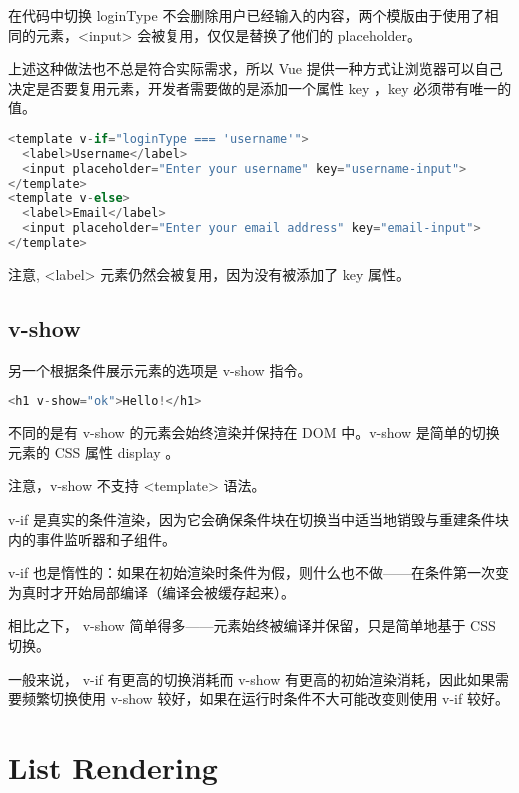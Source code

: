 在代码中切换 loginType 不会删除用户已经输入的内容，两个模版由于使用了相同的元素，<input> 会被复用，仅仅是替换了他们的 placeholder。

上述这种做法也不总是符合实际需求，所以 Vue 提供一种方式让浏览器可以自己决定是否要复用元素，开发者需要做的是添加一个属性 key ，key 必须带有唯一的值。

\begin{lstlisting}[language=JavaScript]
<template v-if="loginType === 'username'">
  <label>Username</label>
  <input placeholder="Enter your username" key="username-input">
</template>
<template v-else>
  <label>Email</label>
  <input placeholder="Enter your email address" key="email-input">
</template>
\end{lstlisting}

注意, <label> 元素仍然会被复用，因为没有被添加了 key 属性。


\subsection{v-show}

另一个根据条件展示元素的选项是 v-show 指令。


\begin{lstlisting}[language=JavaScript]
<h1 v-show="ok">Hello!</h1>
\end{lstlisting}

不同的是有 v-show 的元素会始终渲染并保持在 DOM 中。v-show 是简单的切换元素的 CSS 属性 display 。


注意，v-show 不支持 <template> 语法。

\begin{compactitem}
\item v-if 是真实的条件渲染，因为它会确保条件块在切换当中适当地销毁与重建条件块内的事件监听器和子组件。
\item v-if 也是惰性的：如果在初始渲染时条件为假，则什么也不做——在条件第一次变为真时才开始局部编译（编译会被缓存起来）。
\end{compactitem}


相比之下， v-show 简单得多——元素始终被编译并保留，只是简单地基于 CSS 切换。

一般来说， v-if 有更高的切换消耗而 v-show 有更高的初始渲染消耗，因此如果需要频繁切换使用 v-show 较好，如果在运行时条件不大可能改变则使用 v-if 较好。


\section{List Rendering}


